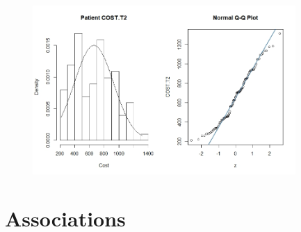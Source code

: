 \documentclass[]{article}
\begin{document}
\begin{figure}[H]
\centering
\includegraphics[width=10cm]{RStudio/jpeg/Norm_T2.jpeg}
\end{figure}
\newpage
\section{Associations}
\end{document}
